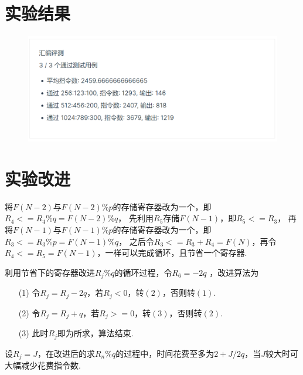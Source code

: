 \documentclass[UTF8]{ctexart}
\begin{document}
\clearpage
\section{实验结果}
\begin{figure}[htbp]
    \centering
    \includegraphics[scale=0.8]{re.png}
\end{figure}

\section{实验改进}
将$F(N-2)$与$F(N-2)\% p$的存储寄存器改为一个，即$R_4 <= R_4 \% q = F(N-2) \% q$，
先利用$R_5$存储$F(N-1)$，即$R_5 <= R_3$，
再将$F(N-1)$与$F(N-1)\% p$的存储寄存器改为一个，即$R_3 <= R_3 \% p = F(N-1) \% q$，
之后令$R_3 <= R_3 + R_4 = F(N)$，再令$R_4 <= R_5 = F(N-1)$，一样可以完成循环，且节省一个寄存器.

利用节省下的寄存器改进$R_j \% q$的循环过程，令$R_6 = -2 q$ ，改进算法为
\begin{enumerate}
    \item [(1)]令$R_j = R_j - 2q$，若$R_j < 0 $，转$(2)$，否则转$(1)$.
    \item [(2)]令$R_j = R_j + q$，若$R_j >= 0 $，转$(3)$，否则转$(2)$.
    \item [(3)]此时$R_j$即为所求，算法结束.
\end{enumerate}
设$R_j = J$，在改进后的求$R_n \% q$的过程中，时间花费至多为$2 + J/2q$，当$J$较大时可大幅减少花费指令数.
\end{document}
